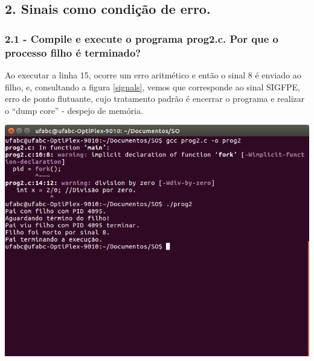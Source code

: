 \subsection*{2. Sinais como condição de erro.}

\subsubsection{2.1 - Compile e execute o programa prog2.c. Por que o processo ﬁlho é terminado?}

\vspace{-0.5em}
\begin{minipage}{\textwidth}
  \hspace{-1em}
  \centering
  
  \label{prog2}
  \hspace{1em}
\end{minipage}
\vspace{0.5em}

Ao executar a linha 15, ocorre um erro aritmético e então o sinal 8 é enviado ao filho, e, consultando a figura \ref{signals}, vemos que corresponde ao sinal SIGFPE, erro de ponto flutuante, cujo tratamento padrão é encerrar o programa e realizar o ``dump core'' - despejo de memória.

\vspace{2em}
\begin{minipage}{\textwidth}
    \hspace{-1em}
    \centering
    \includegraphics[trim=0 250 0 0,clip,scale=.4]{pratica1/prog2.png}
    \label{prog2png}
    \hspace{1em}
\end{minipage}
\vspace{0.5em}

